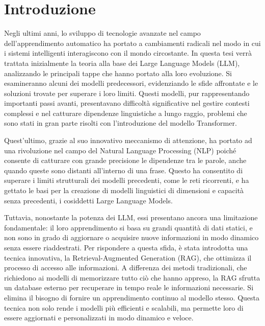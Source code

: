 \chapter*{Introduzione}
Negli ultimi anni, lo sviluppo di tecnologie avanzate nel campo dell'apprendimento automatico ha portato a cambiamenti radicali nel modo in cui i sistemi intelligenti interagiscono con il mondo circostante. In questa tesi verrà trattata inizialmente la teoria alla base dei Large Language Models (LLM), analizzando le principali tappe che hanno portato alla loro evoluzione. Si esamineranno alcuni dei modelli predecessori, evidenziando le sfide affrontate e le soluzioni trovate per superare i loro limiti. Questi modelli, pur rappresentando importanti passi avanti, presentavano difficoltà significative nel gestire contesti complessi e nel catturare dipendenze linguistiche a lungo raggio, problemi che sono stati in gran parte risolti con l'introduzione del modello Transformer.

Quest'ultimo, grazie al suo innovativo meccanismo di attenzione, ha portato ad una rivoluzione nel campo del Natural Language Processing (NLP) poiché consente di catturare con grande precisione le dipendenze tra le parole, anche quando queste sono distanti all'interno di una frase. Questo ha consentito di superare i limiti strutturali dei modelli precedenti, come le reti ricorrenti, e ha gettato le basi per la creazione di modelli linguistici di dimensioni e capacità senza precedenti, i cosiddetti Large Language Models.

Tuttavia, nonostante la potenza dei LLM, essi presentano ancora una limitazione fondamentale: il loro apprendimento si basa su grandi quantità di dati statici, e non sono in grado di aggiornare o acquisire nuove informazioni in modo dinamico senza essere riaddestrati. Per rispondere a questa sfida, è stata introdotta una tecnica innovativa, la Retrieval-Augmented Generation (RAG), che ottimizza il processo di accesso alle informazioni. A differenza dei metodi tradizionali, che richiedono ai modelli di memorizzare tutto ciò che hanno appreso, la RAG sfrutta un database esterno per recuperare in tempo reale le informazioni necessarie. Si elimina il bisogno di fornire un apprendimento continuo al modello stesso. Questa tecnica non solo rende i modelli più efficienti e scalabili, ma permette loro di essere aggiornati e personalizzati in modo dinamico e veloce.

